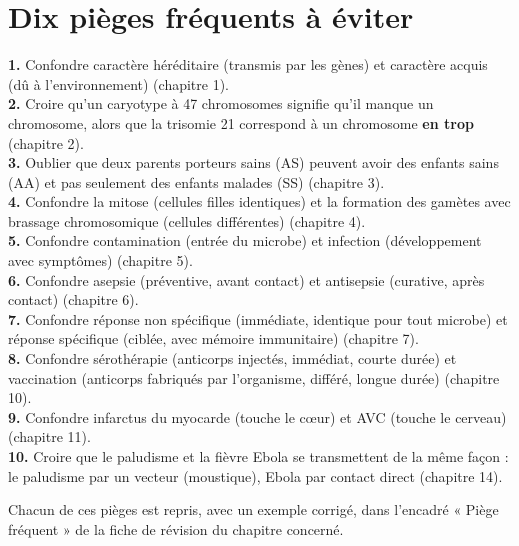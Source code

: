 \section{Dix pièges fréquents à éviter}

\begin{synthese}
\textbf{1.} Confondre caractère héréditaire (transmis par les gènes) et caractère
acquis (dû à l'environnement) (chapitre 1).\\[3pt]
\textbf{2.} Croire qu'un caryotype à 47 chromosomes signifie qu'il manque un
chromosome, alors que la trisomie 21 correspond à un chromosome \textbf{en trop}
(chapitre 2).\\[3pt]
\textbf{3.} Oublier que deux parents porteurs sains (AS) peuvent avoir des enfants
sains (AA) et pas seulement des enfants malades (SS) (chapitre 3).\\[3pt]
\textbf{4.} Confondre la mitose (cellules filles identiques) et la formation des
gamètes avec brassage chromosomique (cellules différentes) (chapitre 4).\\[3pt]
\textbf{5.} Confondre contamination (entrée du microbe) et infection (développement
avec symptômes) (chapitre 5).\\[3pt]
\textbf{6.} Confondre asepsie (préventive, avant contact) et antisepsie (curative,
après contact) (chapitre 6).\\[3pt]
\textbf{7.} Confondre réponse non spécifique (immédiate, identique pour tout microbe)
et réponse spécifique (ciblée, avec mémoire immunitaire) (chapitre 7).\\[3pt]
\textbf{8.} Confondre sérothérapie (anticorps injectés, immédiat, courte durée) et
vaccination (anticorps fabriqués par l'organisme, différé, longue durée)
(chapitre 10).\\[3pt]
\textbf{9.} Confondre infarctus du myocarde (touche le cœur) et AVC (touche le
cerveau) (chapitre 11).\\[3pt]
\textbf{10.} Croire que le paludisme et la fièvre Ebola se transmettent de la même
façon : le paludisme par un vecteur (moustique), Ebola par contact direct
(chapitre 14).
\end{synthese}

\begin{remarque}
Chacun de ces pièges est repris, avec un exemple corrigé, dans l'encadré « Piège
fréquent » de la fiche de révision du chapitre concerné.
\end{remarque}
